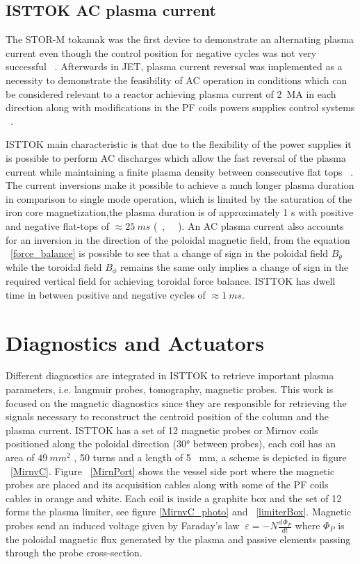 \subsection{ISTTOK AC plasma current}


The STOR-M tokamak was the first device to demonstrate an alternating plasma current even though the control position for negative cycles was not very successful ~\cite{Mitarai1996}. Afterwards in JET, plasma current reversal was implemented as a necessity to demonstrate the feasibility of AC operation in conditions which can be considered relevant to a reactor achieving plasma current of 2~MA in each direction along with modifications in the PF coils powers supplies control systems ~\cite{Tubbing1992}.\smallskip

 ISTTOK  main characteristic  is that due to the flexibility of the power supplies it is possible  to perform  AC  discharges  which  allow the fast reversal of the plasma current while maintaining a finite plasma density between consecutive flat tops  ~\cite{density}. The current inversions make it possible to achieve a much longer plasma duration in comparison to single mode operation, which is limited by the saturation of the iron core magnetization,the plasma duration is of approximately 1 s with positive and negative flat-tops of $\approx 25~ms$ (~\cite{Fernandes1998}, ~\cite{Carvalho2015}~). An AC plasma current also accounts for  an inversion in the direction of the poloidal magnetic field, from the equation ~\ref{force_balance} is possible to see that a change of sign in the poloidal field $B_\theta$ while the toroidal field $B_{\phi}$ remains the same only implies a change of sign in the required vertical field for achieving toroidal force balance. ISTTOK has dwell time in between positive and negative cycles of $\approx 1~ms$.\smallskip


\section{Diagnostics and Actuators}

Different  diagnostics are integrated in ISTTOK to retrieve important plasma parameters, i.e. langmuir probes, tomography, magnetic probes. This work is focused on the magnetic diagnostics  since they are responsible for  retrieving the signals necessary to reconstruct the centroid position of the column and the plasma current. ISTTOK has a set of 12  magnetic  probes or Mirnov coils positioned along the poloidal direction (30° between  probes), each coil has an area of $49 ~mm^2$ , 50 turns and a length of 5 ~mm, a scheme is depicted in figure ~\ref{MirnvC}. Figure ~\ref{MirnPort} shows the vessel side port where the magnetic probes are  placed and its acquisition cables along with some of the PF coils cables in orange and white. Each coil is inside a graphite box and the set of 12 forms the plasma limiter, see figure \ref{MirnvC_photo} and ~\ref{limiterBox}. Magnetic probes send an induced voltage given by Faraday's law $~\varepsilon = -N\frac{d\,\Phi_P}{dt}$ where $\Phi_P$ is the poloidal magnetic flux generated by the plasma and passive elements passing through the probe cross-section.
\smallskip



